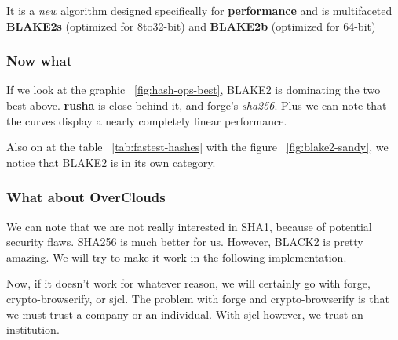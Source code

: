 It is a \textit{new} algorithm designed specifically for \textbf{performance} and is multifaceted \textbf{BLAKE2s} (optimized for 8to32-bit) and \textbf{BLAKE2b} (optimized for 64-bit)

\subsubsection{Now what}

If we look at the graphic ~\ref{fig:hash-ops-best}, BLAKE2 is dominating the two best above. \textbf{rusha} is close behind it, and forge's \textit{sha256}. Plus we can note that the curves display a nearly completely linear performance.

Also on at the table ~\ref{tab:fastest-hashes} with the figure ~\ref{fig:blake2-sandy}, we notice that BLAKE2 is in its own category. 

\subsubsection{What about OverClouds}
We can note that we are not really interested in SHA1, because of potential security flaws. SHA256 is much better for us. However, BLACK2 is pretty amazing. We will try to make it work in the following implementation.

Now, if it doesn't work for whatever reason, we will certainly go with forge, crypto-browserify, or sjcl. The problem with forge and crypto-browserify is that we must trust a company or an individual. With sjcl however, we trust an institution.

